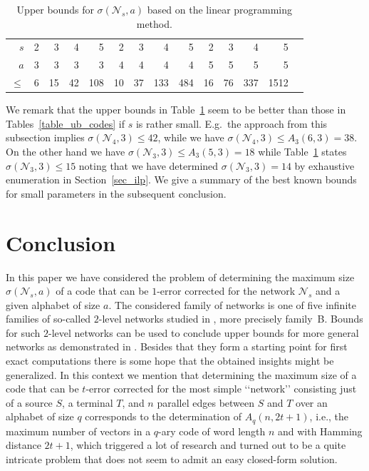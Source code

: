 \documentclass[11pt]{article}
\newcommand{\cN}{\mathcal{N}}
\begin{document}
\begin{table}[htp]
  \begin{center}
    \begin{tabular}{rrrrrrrrrrrrrr}
      \hline
      $s$     & 2 &  3 &  4 &   5 &  2 &  3 &   4 &   5 &  2 &  3 &   4 &    5 \\ 
      $a$     & 3 &  3 &  3 &   3 &  4 &  4 &   4 &   4 &  5 &  5 &   5 &    5 \\ 
      $\le$ & 6 & 15 & 42 & 108 & 10 & 37 & 133 & 484 & 16 & 76 & 337 & 1512 \\
      \hline
    \end{tabular}
    \caption{Upper bounds for $\sigma(\cN_s,a)$ based on the linear programming method.}
    \label{table_ub_codes_2}
  \end{center}   
\end{table}

We remark that the upper bounds in Table~\ref{table_ub_codes_2} seem to be better than those in Tables~\ref{table_ub_codes} if 
$s$ is rather small. E.g.\ the approach from this subsection implies $\sigma(\cN_4,3)\le 42$, while we have $\sigma(\cN_4,3)\le A_3(6,3)=38$. 
On the other hand we have $\sigma(\cN_3,3)\le A_3(5,3)=18$ while Table~\ref{table_ub_codes_2} states $\sigma(\cN_3,3)\le 15$ noting that 
we have determined $\sigma(\cN_3,3)=14$ by exhaustive enumeration in Section~\ref{sec_ilp}. We give a summary of the best known bounds 
for small parameters in the subsequent conclusion. 

\section{Conclusion}
\label{sec_conclusion}

In this paper we have considered the problem of determining the maximum size $\sigma(\cN_s,a)$ of a code that can be $1$-error corrected 
for the network $\cN_s$ and a given alphabet of size $a$. The considered family of networks is one of five infinite 
families of so-called $2$-level networks studied in \cite{beemer2022network_arxiv}, more precisely family~B. Bounds for such $2$-level networks 
can be used to conclude upper bounds for more general networks as demonstrated in \cite{beemer2022network_arxiv}. Besides that they form a 
starting point for first exact computations there is some hope that the obtained insights might be generalized. In this context we mention that determining the
maximum size of a code that can be $t$-error corrected for the most simple {\lq\lq}network{\rq\rq} consisting just of a source $S$, a terminal $T$, 
and $n$ parallel edges between $S$ and $T$ over an alphabet of size $q$ corresponds to the determination of $A_q(n,2t+1)$, i.e., the maximum number 
of vectors in a $q$-ary code of word length $n$ and with Hamming distance $2t+1$, which triggered a lot of research and turned out to be a quite intricate 
problem that does not seem to admit an easy closed-form solution.
\end{document}
